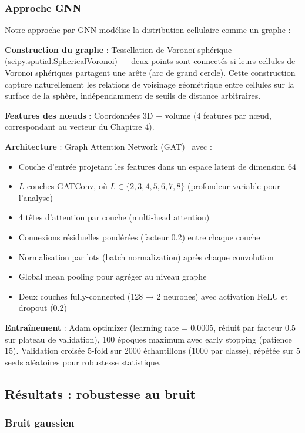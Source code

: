 \subsubsection{Approche GNN}

Notre approche par GNN modélise la distribution cellulaire comme un graphe :

\textbf{Construction du graphe} : Tessellation de Voronoï sphérique (scipy.spatial.SphericalVoronoi) — deux points sont connectés si leurs cellules de Voronoï sphériques partagent une arête (arc de grand cercle). Cette construction capture naturellement les relations de voisinage géométrique entre cellules sur la surface de la sphère, indépendamment de seuils de distance arbitraires.

\textbf{Features des nœuds} : Coordonnées 3D + volume (4 features par nœud, correspondant au vecteur du Chapitre 4).

\textbf{Architecture} : Graph Attention Network (GAT)~\cite{Velickovic2018} avec :
\begin{itemize}
    \item Couche d'entrée projetant les features dans un espace latent de dimension 64
    \item $L$ couches GATConv, où $L \in \{2, 3, 4, 5, 6, 7, 8\}$ (profondeur variable pour l'analyse)
    \item 4 têtes d'attention par couche (multi-head attention)
    \item Connexions résiduelles pondérées (facteur 0.2) entre chaque couche
    \item Normalisation par lots (batch normalization) après chaque convolution
    \item Global mean pooling pour agréger au niveau graphe
    \item Deux couches fully-connected (128 → 2 neurones) avec activation ReLU et dropout (0.2)
\end{itemize}

\textbf{Entraînement} : Adam optimizer (learning rate = 0.0005, réduit par facteur 0.5 sur plateau de validation), 100 époques maximum avec early stopping (patience 15). Validation croisée 5-fold sur 2000 échantillons (1000 par classe), répétée sur 5 seeds aléatoires pour robustesse statistique.

\subsection{Résultats : robustesse au bruit}

\subsubsection{Bruit gaussien}

